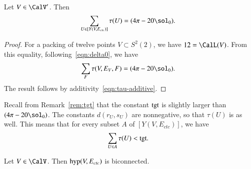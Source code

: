 \documentclass{llncs}
\def\op#1{{\hbox{#1}}}
\begin{document}
\begin{lemma}[] Let $V\in \CalV'$.  Then
\[
\sum_{U\in [Y(V,E_{ctc})]} \tau(U) = (4\pi - 20\sol_0).
\]
\end{lemma}

%
\begin{proof} For a packing of twelve points $V\subset S^2(2)$, we have
$12=\CalL(V)$.   From this equality, following~\eqref{eqn:delta0}, we have
\[
  \sum_F \tau (V,E_{V},F) = (4\pi - 20\sol_0). 
\]
The result follows by additivity~\eqref{eqn:tau-additive}.
\end{proof}

Recall from Remark~\ref{rem:tgt} that the constant $\op{tgt}$ is slightly
larger than $(4\pi-20\sol_0)$.  The constants $d(r_U,s_U)$ are nonnegative, so that
$\tau(U)$ is as well.  This means that for every subset
$A$ of $[Y(V,E_{ctc})]$, we have
\begin{equation}\label{eqn:subtgt}
\sum_{U\in A} \tau(U) < \op{tgt}.
\end{equation}



\begin{lemma}[biconnected]\label{lemma:biconnected}
  Let $V\in \CalV$.  Then $\op{hyp}(V,E_{ctc})$ is biconnected.
\end{lemma}
\end{document}
